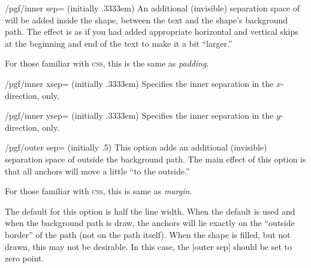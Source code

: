 \begin{key}{/pgf/inner sep= (initially .3333em)}
  An additional (invisible) separation space of  will
  be added inside the shape, between the text and the shape's
  background path. The effect is as if you had added appropriate
  horizontal and vertical skips at the beginning and end of the text
  to make it a bit ``larger.''

  For those familiar with \textsc{css}, this is the same as
  \emph{padding}.

\begin{codeexample}[]
\end{codeexample}
\end{key}

\begin{key}{/pgf/inner xsep= (initially .3333em)}
  Specifies the inner separation in the $x$-direction, only.
\end{key}

\begin{key}{/pgf/inner ysep= (initially .3333em)}
  Specifies the inner separation in the $y$-direction, only.
\end{key}

\begin{key}{/pgf/outer sep= (initially .5\string\pgflinewidth)}
  This option adds an additional (invisible) separation space of
   outside the background path. The main effect of
  this option is that all anchors will move a little ``to the
  outside.''

  For those familiar with \textsc{css}, this is same as \emph{margin}.

  The default for this option is half the line width. When the default
  is used and when the background path is draw, the anchors will lie
  exactly on the ``outside border'' of the path (not on the path
  itself). When the shape is filled, but not drawn, this may not be
  desirable. In this case, the |outer sep| should be set to zero
  point.
\begin{codeexample}[]
\end{codeexample}
\end{key}

